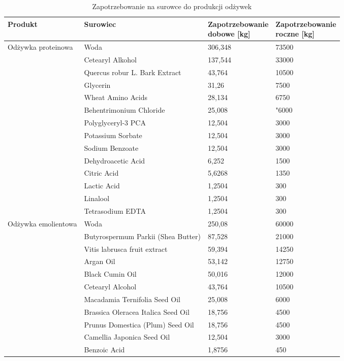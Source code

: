 \begin{table}[h]
	\centering
	\caption{Zapotrzebowanie na surowce do produkcji odżywek}
	\begin{tabular}{llll}
		\hline
		\textbf{Produkt} & \textbf{Surowiec} & \makecell[l]{\textbf{Zapotrzebowanie} \\ \textbf{dobowe [kg]}} & \makecell[l]{\textbf{Zapotrzebowanie} \\ \textbf{roczne [kg]}} \\
		\hline\hline
		\multirow{14}{*}{Odżywka proteinowa} & Woda & 306,348 & 73500 \\
		 & Cetearyl Alkohol & 137,544 & 33000 \\
		 & Quercus robur L. Bark Extract & 43,764 & 10500 \\
		 & Glycerin & 31,26 & 7500 \\
		 & Wheat Amino Acids & 28,134 & 6750 \\
		 & Behentrimonium Chloride & 25,008 & "6000 \\
		 & Polyglyceryl-3 PCA & 12,504 & 3000 \\
		 & Potassium Sorbate & 12,504 & 3000 \\
		 & Sodium Benzoate & 12,504 & 3000 \\
		 & Dehydroacetic Acid & 6,252 & 1500 \\
		 & Citric Acid & 5,6268 & 1350 \\
		 & Lactic Acid & 1,2504 & 300 \\
		 & Linalool & 1,2504 & 300 \\
		 & Tetrasodium EDTA & 1,2504 & 300 \\
		\hline
		\multirow{14}{*}{Odżywka emolientowa} & Woda & 250,08 & 60000 \\
		 & Butyrospermum Parkii (Shea Butter) & 87,528 & 21000 \\
		 & Vitis labrusca fruit extract & 59,394 & 14250 \\
		 & Argan Oil & 53,142 & 12750 \\
		 & Black Cumin Oil & 50,016 & 12000 \\
		 & Cetearyl Alcohol & 43,764 & 10500 \\
		 & Macadamia Ternifolia Seed Oil & 25,008 & 6000 \\
		 & Brassica Oleracea Italica Seed Oil & 18,756 & 4500 \\
		 & Prunus Domestica (Plum) Seed Oil & 18,756 & 4500 \\
		 & Camellia Japonica Seed Oil & 12,504 & 3000 \\
		 & Benzoic Acid & 1,8756 & 450 \\

\end{tabular}
\end{table}
